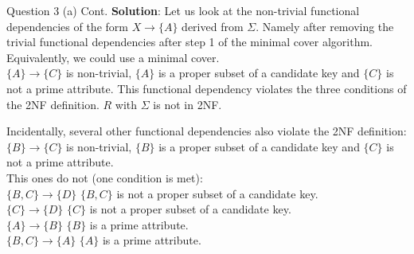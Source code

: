 \begin{frame}[fragile]{Question 3 (a) Cont.}
\textbf{Solution}:
Let us look at the non-trivial functional dependencies of the form $X \rightarrow \{A\}$ derived from $\Sigma$. Namely after removing the trivial functional dependencies after step 1 of the minimal cover algorithm. Equivalently, we could use a minimal cover.\\\vspace{3pt}
$\{A\} \rightarrow \{C\}$ is non-trivial, $\{A\}$ is a proper subset of a candidate key and $\{C\}$ is not a prime attribute. This functional dependency violates the three conditions of the 2NF definition. $R$ with $\Sigma$ is not in 2NF.\\\vspace{3pt}

Incidentally, several other functional dependencies also violate the 2NF definition:\\
$\{B\} \rightarrow \{C\}$ is non-trivial, $\{B\}$ is a proper subset of a candidate key and $\{C\}$ is not a prime attribute. \\\vspace{3pt}
This ones do not (one condition is met):\\
$\{B,C\} \rightarrow \{D\}$ $\{B,C\}$ is not a proper subset of a candidate key.\\
$\{C\} \rightarrow \{D\}$ $\{C\}$ is not a proper subset of a candidate key.\\
$\{A\} \rightarrow \{B\}$ $\{B\}$ is a prime attribute.\\
$\{B, C\} \rightarrow \{A\}$ $\{A\}$ is a prime attribute.
\end{frame}

